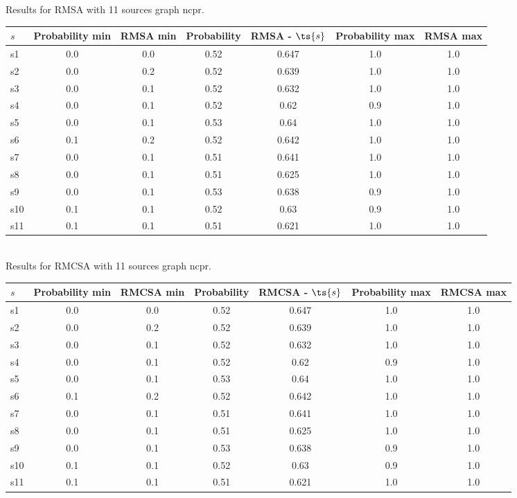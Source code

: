 \documentclass{article}
\begin{document}
\noindent Results for RMSA with 11 sources graph ncpr.

\noindent\begin{tabular}{|l|c|c|c|c|c|c|}
\hline
$s$& Probability min & RMSA min & Probability & RMSA - $\ts{s}$ & Probability max & RMSA max\\
\hline
s1 &0.0 & 0.0 & 0.52 & 0.647 & 1.0 & 1.0\\
\hline
s2 &0.0 & 0.2 & 0.52 & 0.639 & 1.0 & 1.0\\
\hline
s3 &0.0 & 0.1 & 0.52 & 0.632 & 1.0 & 1.0\\
\hline
s4 &0.0 & 0.1 & 0.52 & 0.62 & 0.9 & 1.0\\
\hline
s5 &0.0 & 0.1 & 0.53 & 0.64 & 1.0 & 1.0\\
\hline
s6 &0.1 & 0.2 & 0.52 & 0.642 & 1.0 & 1.0\\
\hline
s7 &0.0 & 0.1 & 0.51 & 0.641 & 1.0 & 1.0\\
\hline
s8 &0.0 & 0.1 & 0.51 & 0.625 & 1.0 & 1.0\\
\hline
s9 &0.0 & 0.1 & 0.53 & 0.638 & 0.9 & 1.0\\
\hline
s10 &0.1 & 0.1 & 0.52 & 0.63 & 0.9 & 1.0\\
\hline
s11 &0.1 & 0.1 & 0.51 & 0.621 & 1.0 & 1.0\\
\hline
\end{tabular}\\

\noindent Results for RMCSA with 11 sources graph ncpr.

\noindent\begin{tabular}{|l|c|c|c|c|c|c|}
\hline
$s$& Probability min & RMCSA min & Probability & RMCSA - $\ts{s}$ & Probability max & RMCSA max\\
\hline
s1 &0.0 & 0.0 & 0.52 & 0.647 & 1.0 & 1.0\\
\hline
s2 &0.0 & 0.2 & 0.52 & 0.639 & 1.0 & 1.0\\
\hline
s3 &0.0 & 0.1 & 0.52 & 0.632 & 1.0 & 1.0\\
\hline
s4 &0.0 & 0.1 & 0.52 & 0.62 & 0.9 & 1.0\\
\hline
s5 &0.0 & 0.1 & 0.53 & 0.64 & 1.0 & 1.0\\
\hline
s6 &0.1 & 0.2 & 0.52 & 0.642 & 1.0 & 1.0\\
\hline
s7 &0.0 & 0.1 & 0.51 & 0.641 & 1.0 & 1.0\\
\hline
s8 &0.0 & 0.1 & 0.51 & 0.625 & 1.0 & 1.0\\
\hline
s9 &0.0 & 0.1 & 0.53 & 0.638 & 0.9 & 1.0\\
\hline
s10 &0.1 & 0.1 & 0.52 & 0.63 & 0.9 & 1.0\\
\hline
s11 &0.1 & 0.1 & 0.51 & 0.621 & 1.0 & 1.0\\
\hline
\end{tabular}\\
\end{document}
